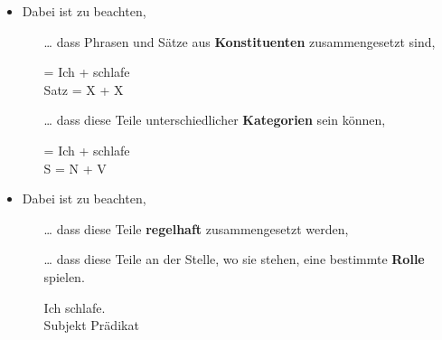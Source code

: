 \begin{frame}

\begin{itemize}
\item Dabei ist zu beachten, 

\begin{itemize}
	\item [\dots] dass Phrasen und Sätze aus \textbf{Konstituenten} zusammengesetzt sind,

	\ea
	 = Ich + schlafe\\
	Satz = X + X \\
	\z

\pause

	\item [\dots] dass diese Teile unterschiedlicher \textbf{Kategorien} sein können,

	\ea 
	 = Ich + schlafe\\
	S = N + V \\
	\z

\end{itemize}

\end{itemize}

\end{frame}


\begin{frame}

\begin{itemize}
\item Dabei ist zu beachten, 

\begin{itemize}

	\item [\dots] dass diese Teile \textbf{regelhaft} zusammengesetzt werden,

	\eal 
	\zl

\pause

	\item [\dots] dass diese Teile an der Stelle, wo sie stehen, eine bestimmte \textbf{Rolle} spielen.
			
	\ea
	\gll Ich schlafe.\\
	Subjekt Prädikat\\
	\z
	
\end{itemize}

\end{itemize}

\end{frame}



